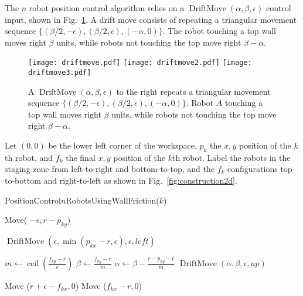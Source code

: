 The $n$ robot position control algorithm relies on a $\operatorname{DriftMove}(\alpha, \beta, \epsilon)$ control input, shown in Fig.\  \ref{fig:driftmove}.
A drift move consists of repeating a triangular movement sequence $\{ (\beta/2,-\epsilon),(\beta/2,\epsilon),(-\alpha,0)\}$. The robot touching a top wall moves right $\beta$ units, while robots not touching the top move right $\beta-\alpha$.

\begin{figure}
\begin{center}
	\texttt{[image: driftmove.pdf]}
	\texttt{[image: driftmove2.pdf]}
	\texttt{[image: driftmove3.pdf]}
\end{center}
\vspace{-1em}
\caption{\label{fig:driftmove}
A  $\operatorname{DriftMove}(\alpha, \beta, \epsilon)$ to the right repeats a triangular movement sequence $\{ (\beta/2,-\epsilon),(\beta/2,\epsilon),(-\alpha,0)\}$. Robot $A$ touching a top wall moves right $\beta$ units, while robots not touching the top move right $\beta-\alpha$.}
\vspace{-1em}
\end{figure}

Let $(0,0)$ be the lower left corner of the workspace, $p_k$ the $x,y$ position of the $k$th robot, and $f_k$ the final $x,y$ position of the $k$th robot. Label the robots in the staging zone from left-to-right and bottom-to-top, and the $f_k$ configurations top-to-bottom and right-to-left as shown in Fig.~\ref{fig:construction2d}.

\begin{algorithm}
\caption{PositionControl$n$RobotsUsingWallFriction($k$)}\label{alg:PosControlNRobots}
\begin{algorithmic}[1]
\State Move( $-\epsilon, r-p_{ky}$) %


\State $\operatorname{DriftMove}(\epsilon, \min(p_{kx} - r,\epsilon), \epsilon,left)$    %
\EndWhile

\State $m \gets \operatorname{ceil}(\frac{f_{ky}-r}{\epsilon})$
\State $\beta \gets \frac{f_{ky}-r}{m}$
\State $\alpha \gets \beta - \frac{r - p_{ky}-\epsilon}{m}$
\State $\operatorname{DriftMove}(\alpha, \beta, \epsilon,up)$    %
\EndFor

\State Move ($r+\epsilon-f_{kx}, 0$)  %
\State Move ($f_{kx}-r, 0$)  

\end{algorithmic}
\end{algorithm}


